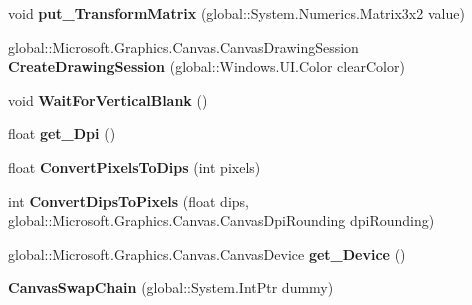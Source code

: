 \begin{DoxyCompactItemize}
\item 
\mbox{\label{class_microsoft_1_1_graphics_1_1_canvas_1_1_canvas_swap_chain_ad28f820299100bac196380421a7a0b85}} 
void {\bfseries put\+\_\+\+Transform\+Matrix} (global\+::\+System.\+Numerics.\+Matrix3x2 value)
\item 
\mbox{\label{class_microsoft_1_1_graphics_1_1_canvas_1_1_canvas_swap_chain_aa66e0d5dceb643547c2d3c4cd32524d5}} 
global\+::\+Microsoft.\+Graphics.\+Canvas.\+Canvas\+Drawing\+Session {\bfseries Create\+Drawing\+Session} (global\+::\+Windows.\+U\+I.\+Color clear\+Color)
\item 
\mbox{\label{class_microsoft_1_1_graphics_1_1_canvas_1_1_canvas_swap_chain_a61aee63789e72938059605776f93e0cb}} 
void {\bfseries Wait\+For\+Vertical\+Blank} ()
\item 
\mbox{\label{class_microsoft_1_1_graphics_1_1_canvas_1_1_canvas_swap_chain_a57b260bc4cfac4ae4de27a622597842d}} 
float {\bfseries get\+\_\+\+Dpi} ()
\item 
\mbox{\label{class_microsoft_1_1_graphics_1_1_canvas_1_1_canvas_swap_chain_ae9f72e86c9c20acc20c87071b984edf3}} 
float {\bfseries Convert\+Pixels\+To\+Dips} (int pixels)
\item 
\mbox{\label{class_microsoft_1_1_graphics_1_1_canvas_1_1_canvas_swap_chain_ac11cc05881238dae1f5c353c24222685}} 
int {\bfseries Convert\+Dips\+To\+Pixels} (float dips, global\+::\+Microsoft.\+Graphics.\+Canvas.\+Canvas\+Dpi\+Rounding dpi\+Rounding)
\item 
\mbox{\label{class_microsoft_1_1_graphics_1_1_canvas_1_1_canvas_swap_chain_a728f12738ca799060ecafc7879c8dd58}} 
global\+::\+Microsoft.\+Graphics.\+Canvas.\+Canvas\+Device {\bfseries get\+\_\+\+Device} ()
\item 
\mbox{\label{class_microsoft_1_1_graphics_1_1_canvas_1_1_canvas_swap_chain_aad6c8f27597930094a373c7767649cc4}} 
{\bfseries Canvas\+Swap\+Chain} (global\+::\+System.\+Int\+Ptr dummy)
\end{DoxyCompactItemize}
